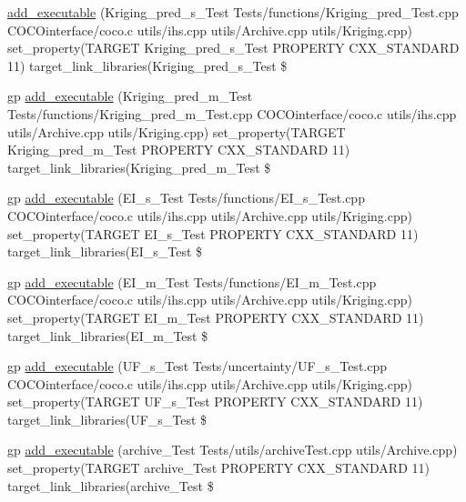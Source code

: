 \begin{DoxyCompactItemize}
\item 
\hyperlink{CMakeLists_8txt_ac7cff542f38b65d44c2599828d7d9864}{add\+\_\+executable} (Kriging\+\_\+pred\+\_\+s\+\_\+\+Test Tests/functions/Kriging\+\_\+pred\+\_\+\+Test.\+cpp C\+O\+C\+Ointerface/coco.\+c utils/ihs.\+cpp utils/Archive.\+cpp utils/Kriging.\+cpp) set\+\_\+property(T\+A\+R\+G\+ET Kriging\+\_\+pred\+\_\+s\+\_\+\+Test P\+R\+O\+P\+E\+R\+TY C\+X\+X\+\_\+\+S\+T\+A\+N\+D\+A\+RD 11) target\+\_\+link\+\_\+libraries(Kriging\+\_\+pred\+\_\+s\+\_\+\+Test \$
\item 
gp \hyperlink{CMakeLists_8txt_ae25a0896c35aa4e68595528359340551}{add\+\_\+executable} (Kriging\+\_\+pred\+\_\+m\+\_\+\+Test Tests/functions/Kriging\+\_\+pred\+\_\+m\+\_\+\+Test.\+cpp C\+O\+C\+Ointerface/coco.\+c utils/ihs.\+cpp utils/Archive.\+cpp utils/Kriging.\+cpp) set\+\_\+property(T\+A\+R\+G\+ET Kriging\+\_\+pred\+\_\+m\+\_\+\+Test P\+R\+O\+P\+E\+R\+TY C\+X\+X\+\_\+\+S\+T\+A\+N\+D\+A\+RD 11) target\+\_\+link\+\_\+libraries(Kriging\+\_\+pred\+\_\+m\+\_\+\+Test \$
\item 
gp \hyperlink{CMakeLists_8txt_adb82f0d27ff42f4a3f765467e68e0552}{add\+\_\+executable} (E\+I\+\_\+s\+\_\+\+Test Tests/functions/E\+I\+\_\+s\+\_\+\+Test.\+cpp C\+O\+C\+Ointerface/coco.\+c utils/ihs.\+cpp utils/Archive.\+cpp utils/Kriging.\+cpp) set\+\_\+property(T\+A\+R\+G\+ET E\+I\+\_\+s\+\_\+\+Test P\+R\+O\+P\+E\+R\+TY C\+X\+X\+\_\+\+S\+T\+A\+N\+D\+A\+RD 11) target\+\_\+link\+\_\+libraries(E\+I\+\_\+s\+\_\+\+Test \$
\item 
gp \hyperlink{CMakeLists_8txt_afe84739f86739c8b70cebef9ffbc7747}{add\+\_\+executable} (E\+I\+\_\+m\+\_\+\+Test Tests/functions/E\+I\+\_\+m\+\_\+\+Test.\+cpp C\+O\+C\+Ointerface/coco.\+c utils/ihs.\+cpp utils/Archive.\+cpp utils/Kriging.\+cpp) set\+\_\+property(T\+A\+R\+G\+ET E\+I\+\_\+m\+\_\+\+Test P\+R\+O\+P\+E\+R\+TY C\+X\+X\+\_\+\+S\+T\+A\+N\+D\+A\+RD 11) target\+\_\+link\+\_\+libraries(E\+I\+\_\+m\+\_\+\+Test \$
\item 
gp \hyperlink{CMakeLists_8txt_ad71527de44712bbe18184849cb4f3f40}{add\+\_\+executable} (U\+F\+\_\+s\+\_\+\+Test Tests/uncertainty/U\+F\+\_\+s\+\_\+\+Test.\+cpp C\+O\+C\+Ointerface/coco.\+c utils/ihs.\+cpp utils/Archive.\+cpp utils/Kriging.\+cpp) set\+\_\+property(T\+A\+R\+G\+ET U\+F\+\_\+s\+\_\+\+Test P\+R\+O\+P\+E\+R\+TY C\+X\+X\+\_\+\+S\+T\+A\+N\+D\+A\+RD 11) target\+\_\+link\+\_\+libraries(U\+F\+\_\+s\+\_\+\+Test \$
\item 
gp \hyperlink{CMakeLists_8txt_a43c5541c311f3c659221a90c7152ebd9}{add\+\_\+executable} (archive\+\_\+\+Test Tests/utils/archive\+Test.\+cpp utils/Archive.\+cpp) set\+\_\+property(T\+A\+R\+G\+ET archive\+\_\+\+Test P\+R\+O\+P\+E\+R\+TY C\+X\+X\+\_\+\+S\+T\+A\+N\+D\+A\+RD 11) target\+\_\+link\+\_\+libraries(archive\+\_\+\+Test \$

\end{DoxyCompactItemize}
